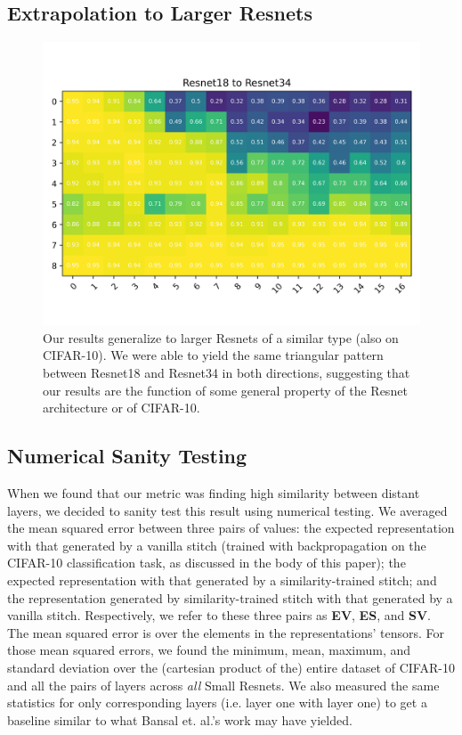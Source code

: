 \documentclass{article}
\begin{document}
\subsection*{Extrapolation to Larger Resnets}
\begin{center}
  \begin{figure}[H]
     \centering
     \includegraphics[width=14cm]{bigboi.png}
     \caption{Our results generalize to larger Resnets of a similar type (also on CIFAR-10).
     We were able to yield the same triangular pattern between Resnet18 and Resnet34 in both
     directions, suggesting that our results are the function of some general property of the
     Resnet architecture or of CIFAR-10.}
  \end{figure}
\end{center}
\subsection*{Numerical Sanity Testing}
When we found that our metric was finding high similarity between distant layers, we decided to sanity test
this result using numerical testing. We averaged the mean squared error between three pairs of values:
the expected representation with that generated by a vanilla stitch (trained with backpropagation on the CIFAR-10
classification task, as discussed in the body of this paper); the expected representation with that generated 
by a similarity-trained stitch; and the representation generated by similarity-trained stitch with that generated 
by a vanilla stitch. Respectively, we refer to these three pairs as \textbf{EV}, \textbf{ES}, and \textbf{SV}.
The mean squared error is over the elements in the representations' tensors. For those mean squared errors, we
found the minimum, mean, maximum, and standard deviation over the (cartesian product of the) entire dataset of
CIFAR-10 and all the pairs of layers across \textit{all} Small Resnets. We also measured the same statistics
for only corresponding layers (i.e. layer one with layer one) to get a baseline similar to what Bansal
et. al.'s work may have yielded.
\end{document}
